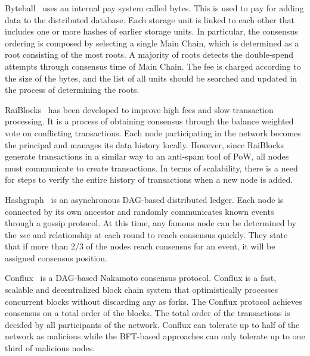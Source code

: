 \documentclass[preprint,12pt]{elsarticle}
\begin{document}
Byteball~\cite{byteball16} uses an internal pay system called bytes. This is used to pay for adding data to the distributed database. Each storage unit is linked to each other that includes one or more hashes of earlier storage units. In particular, the consensus ordering is composed by selecting a single Main Chain, which is determined as a root consisting of the most roots. 
A majority of roots detects the double-spend attempts through consensus time of Main Chain. The fee is charged according to the size of the bytes, and the list of all units should be searched and updated in the process of determining the roots.

RaiBlocks~\cite{raiblock17} has been developed to improve high fees and slow transaction processing.  It is a process of obtaining consensus through the balance weighted vote on conflicting transactions. Each node participating in the network becomes the principal and manages its data history locally. However, since RaiBlocks generate transactions in a similar way to an anti-spam tool of PoW, all nodes must communicate to create transactions. In terms of scalability, there is a need for steps to verify the entire history of transactions when a new node is added.

Hashgraph~\cite{hashgraph16} is an asynchronous DAG-based distributed ledger. Each node is connected by its own ancestor and randomly communicates known events through a gossip protocol. At this time, any famous node can be determined by the \textit{see} and  relationship at each round to reach consensus quickly. They state that if more than 2/3 of the nodes reach consensus for an event, it will be assigned consensus position.

Conflux~\cite{conflux18} is a DAG-based Nakamoto consensus protocol. Conflux is a fast, scalable and decentralized block chain system that optimistically processes concurrent blocks without discarding any as forks. The Conflux protocol achieves consensus on a total order of the blocks.
The total order of the transactions is decided by all participants of the network. Conflux can tolerate up to half of the network as malicious while the BFT-based approaches can only tolerate up to one third of malicious nodes.
\end{document}
